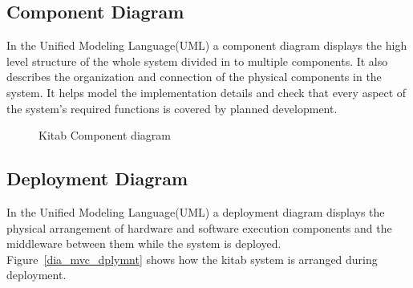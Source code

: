       \pagebreak

      \subsection{Component Diagram}

      In the Unified Modeling Language(UML) a component diagram displays the high level structure of the whole system divided in to multiple components. It also describes the organization and connection of the physical components in the system. It helps model the implementation details and check that every aspect of the system's required functions is covered by planned development.

      \vspace{0.5in}

		\begin{figure}[H]
		\begin{center}

		\caption{Kitab Component diagram}
		\label{dia_mvc_cmpnt}

		\end{center}
		\end{figure}

      \pagebreak
      
      \subsection{Deployment Diagram}

      In the Unified Modeling Language(UML) a deployment diagram displays the physical arrangement of hardware and software execution components and the middleware between them while the system is deployed. Figure~\ref{dia_mvc_dplymnt} shows how the kitab system is arranged during deployment.

      \vspace{0.5in}

